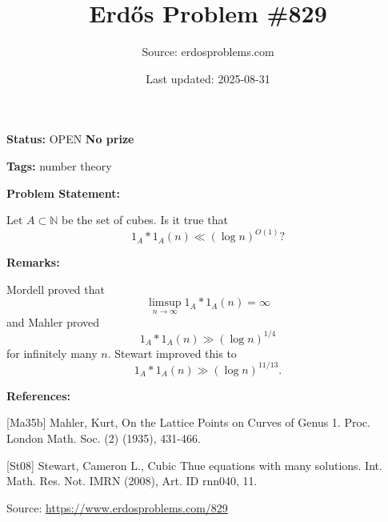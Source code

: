 \documentclass{article}
\title{Erd\H{o}s Problem \#829}
\date{Last updated: 2025-08-31}
\author{Source: erdosproblems.com}
\begin{document}
\maketitle

\noindent\textbf{Status:} OPEN \quad \textbf{No prize}

\noindent\textbf{Tags:} number theory

\medskip
\noindent\textbf{Problem Statement:}

Let $A\subset\mathbb{N}$ be the set of cubes. Is it true that\[1_A\ast 1_A(n) \ll (\log n)^{O(1)}?\]

\bigskip
\noindent\textbf{Remarks:}

Mordell proved that\[\limsup_{n\to \infty} 1_A\ast 1_A(n)=\infty\]and Mahler \cite{Ma35b} proved\[1_A\ast 1_A(n) \gg (\log n)^{1/4}\]for infinitely many $n$. Stewart \cite{St08} improved this to\[1_A\ast 1_A(n) \gg (\log n)^{11/13}.\]

\bigskip
\noindent\textbf{References:}

[Ma35b] Mahler, Kurt, On the Lattice Points on Curves of Genus 1. Proc. London Math. Soc. (2) (1935), 431-466.
 
 [St08] Stewart, Cameron L., Cubic Thue equations with many solutions. Int. Math. Res. Not. IMRN (2008), Art. ID rnn040, 11.

\bigskip
\noindent\small{Source: \url{https://www.erdosproblems.com/829}}
\end{document}
